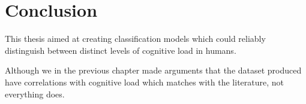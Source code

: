\chapter{Conclusion}

This thesis aimed at creating classification models which could reliably distinguish between distinct levels of cognitive load in humans.



Although we in the previous chapter made arguments that the dataset produced have correlations with cognitive load which matches with the literature, not everything does.